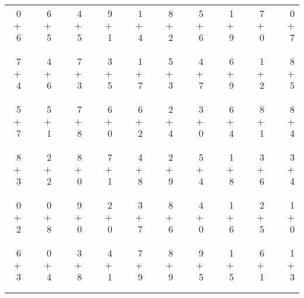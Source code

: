 \documentclass[12pt, letterpaper]{article}
\begin{document}
\begin{tabular}{rrrrrrrrrrrrrrrrrrr}
0 & & 6 & & 4 & & 9 & & 1 & & 8 & & 5 & & 1 & & 7 & & 0\\
$+$ 6 & & $+$ 5 & & $+$ 5 & & $+$ 1 & & $+$ 4 & & $+$ 2 & & $+$ 6 & & $+$ 9 & & $+$ 0 & & $+$ 7\\
\cline{1-1} \cline{3-3} \cline{5-5} \cline{7-7} \cline{9-9} \cline{11-11} \cline{13-13} \cline{15-15} \cline{17-17} \cline{19-19} \\ \\
7 & & 4 & & 7 & & 3 & & 1 & & 5 & & 4 & & 6 & & 1 & & 8\\
$+$ 4 & & $+$ 6 & & $+$ 3 & & $+$ 5 & & $+$ 7 & & $+$ 3 & & $+$ 7 & & $+$ 9 & & $+$ 2 & & $+$ 5\\
\cline{1-1} \cline{3-3} \cline{5-5} \cline{7-7} \cline{9-9} \cline{11-11} \cline{13-13} \cline{15-15} \cline{17-17} \cline{19-19} \\ \\
5 & & 5 & & 7 & & 6 & & 6 & & 2 & & 3 & & 6 & & 8 & & 8\\
$+$ 7 & & $+$ 1 & & $+$ 8 & & $+$ 0 & & $+$ 2 & & $+$ 4 & & $+$ 0 & & $+$ 4 & & $+$ 1 & & $+$ 4\\
\cline{1-1} \cline{3-3} \cline{5-5} \cline{7-7} \cline{9-9} \cline{11-11} \cline{13-13} \cline{15-15} \cline{17-17} \cline{19-19} \\ \\
8 & & 2 & & 8 & & 7 & & 4 & & 2 & & 5 & & 1 & & 3 & & 3\\
$+$ 3 & & $+$ 2 & & $+$ 0 & & $+$ 1 & & $+$ 8 & & $+$ 9 & & $+$ 4 & & $+$ 8 & & $+$ 6 & & $+$ 4\\
\cline{1-1} \cline{3-3} \cline{5-5} \cline{7-7} \cline{9-9} \cline{11-11} \cline{13-13} \cline{15-15} \cline{17-17} \cline{19-19} \\ \\
0 & & 0 & & 9 & & 2 & & 3 & & 8 & & 4 & & 1 & & 2 & & 1\\
$+$ 2 & & $+$ 8 & & $+$ 0 & & $+$ 0 & & $+$ 7 & & $+$ 6 & & $+$ 0 & & $+$ 6 & & $+$ 5 & & $+$ 0\\
\cline{1-1} \cline{3-3} \cline{5-5} \cline{7-7} \cline{9-9} \cline{11-11} \cline{13-13} \cline{15-15} \cline{17-17} \cline{19-19} \\ \\
6 & & 0 & & 3 & & 4 & & 7 & & 8 & & 9 & & 1 & & 6 & & 1\\
$+$ 3 & & $+$ 4 & & $+$ 8 & & $+$ 1 & & $+$ 9 & & $+$ 9 & & $+$ 5 & & $+$ 5 & & $+$ 1 & & $+$ 3\\
\cline{1-1} \cline{3-3} \cline{5-5} \cline{7-7} \cline{9-9} \cline{11-11} \cline{13-13} \cline{15-15} \cline{17-17} \cline{19-19} \\ \\

\end{tabular}
\end{document}
